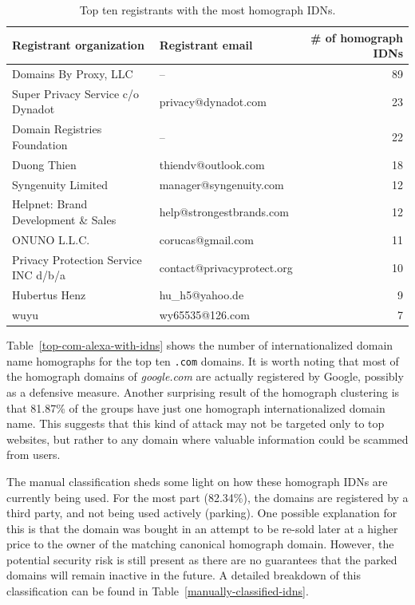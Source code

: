 \documentclass[letterpaper,twocolumn,10pt]{article}
\begin{document}
\begin{table}[]
\centering
\begin{tabular}{llr}
\hline
Registrant organization              & Registrant email           & \# of homograph IDNs \\ \hline
Domains By Proxy, LLC                & --                         & 89                   \\
Super Privacy Service c/o Dynadot    & privacy@dynadot.com        & 23                   \\
Domain Registries Foundation         & --                         & 22                   \\
Duong Thien                          & thiendv@outlook.com        & 18                   \\
Syngenuity Limited                   & manager@syngenuity.com     & 12                   \\
Helpnet: Brand Development \& Sales  & help@strongestbrands.com   & 12                   \\
ONUNO L.L.C.                         & corucas@gmail.com          & 11                   \\
Privacy Protection Service INC d/b/a & contact@privacyprotect.org & 10                   \\
Hubertus Henz                        & hu\_h5@yahoo.de            & 9                    \\
wuyu                                 & wy65535@126.com            & 7                    \\ \hline
\end{tabular}
\caption{Top ten registrants with the most homograph IDNs.}
\label{top-registrants-homograph-idns}
\end{table}

Table~\ref{top-com-alexa-with-idns} shows the number of internationalized domain name homographs for the top ten \texttt{.com} domains.
It is worth noting that most of the homograph domains of \textit{google.com} are actually registered by Google, possibly as a defensive measure.
Another surprising result of the homograph clustering is that 81.87\% of the groups have just one homograph internationalized domain name.
This suggests that this kind of attack may not be targeted only to top websites, but rather to any domain where valuable information could be scammed from users.

The manual classification sheds some light on how these homograph IDNs are currently being used.
For the most part (82.34\%), the domains are registered by a third party, and not being used actively (parking).
One possible explanation for this is that the domain was bought in an attempt to be re-sold later at a higher price to the owner of the matching canonical homograph domain.
However, the potential security risk is still present as there are no guarantees that the parked domains will remain inactive in the future.
A detailed breakdown of this classification can be found in Table~\ref{manually-classified-idns}.
\end{document}
